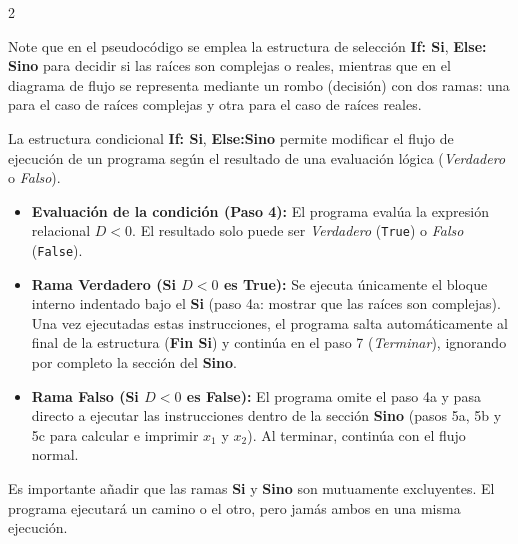 \documentclass[12pt]{article}
\begin{document}
\begin{multicols}{2}
\begin{center}
{
}
\end{center}
\end{multicols}
Note que en el pseudocódigo se emplea la estructura de selección \textbf{If: Si}, 
\textbf{Else: Sino} 
para decidir si las raíces son complejas o reales, mientras que en el diagrama de flujo 
se representa mediante un rombo (decisión) con dos ramas: una para el caso de raíces 
complejas y otra para el caso de raíces reales. 

La estructura condicional  \textbf{If: Si}, 
\textbf{Else:Sino} permite
 modificar el flujo de ejecución de un programa según el resultado de una
 evaluación lógica (\textit{Verdadero} o \textit{Falso}).

\begin{itemize}
    \item \textbf{Evaluación de la condición (Paso 4):} El programa evalúa la expresión relacional $D < 0$. El resultado solo puede ser \textit{Verdadero} (\texttt{True}) o \textit{Falso} (\texttt{False}).
    
    \item \textbf{Rama Verdadero (Si $D < 0$ es True):} 
    Se ejecuta únicamente el bloque interno indentado bajo el \textbf{Si}
    (paso 4a: mostrar que las raíces son complejas). Una vez ejecutadas 
    estas instrucciones, el programa salta automáticamente al final de 
    la estructura (\textbf{Fin Si}) y continúa en el paso 7 (\textit{Terminar}), ignorando por completo la sección del \textbf{Sino}.

    \item \textbf{Rama Falso (Si $D < 0$ es False):} 
    El programa omite el paso 4a y pasa directo a ejecutar las instrucciones dentro de la sección \textbf{Sino} (pasos 5a, 5b y 5c para calcular e imprimir $x_1$ y $x_2$). Al terminar, continúa con el flujo normal.
\end{itemize}
Es importante añadir que las ramas \textbf{Si} y \textbf{Sino} son 
mutuamente excluyentes.
El programa ejecutará un camino o el otro, pero jamás ambos en una misma 
ejecución.
\end{document}

